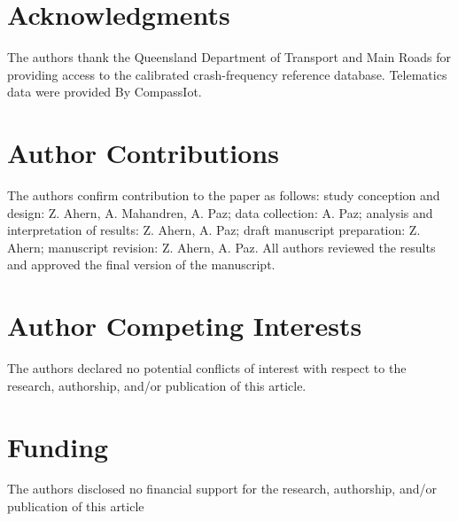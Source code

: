 \documentclass[letterpaper,8pt]{extarticle}  %
\begin{document}
\section*{Acknowledgments}
The authors thank the Queensland Department of Transport and Main Roads for providing access to the calibrated crash-frequency reference database. Telematics data were provided By CompassIot.

\section*{Author Contributions}
The authors confirm contribution to the paper as follows:
study conception and design: Z. Ahern, A. Mahandren, A. Paz;
data collection: A. Paz;
analysis and interpretation of results:  Z. Ahern, A. Paz;
draft manuscript preparation: Z. Ahern;
manuscript revision: Z. Ahern, A. Paz.
All authors reviewed the results and approved the final version of the manuscript.

\section*{Author Competing Interests}
The authors declared no potential conflicts of interest with respect to the research, authorship, and/or publication of this article.

\section*{Funding}
The authors disclosed no financial support for the research, authorship, and/or publication of this article

\begin{footnotesize}
\textnormal{}
\end{footnotesize}
\end{document}
